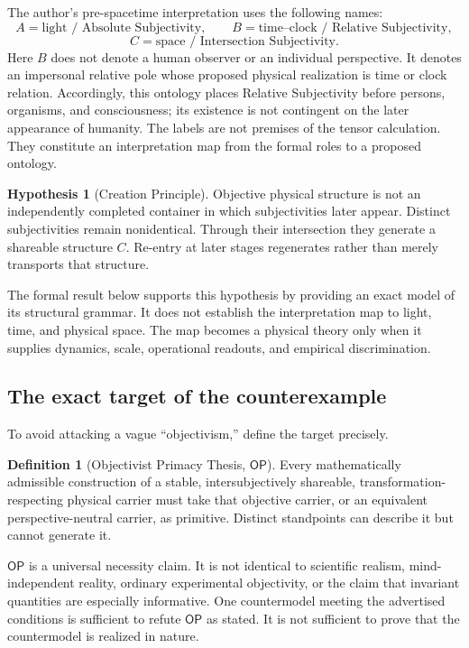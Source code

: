 \documentclass[11pt]{article}
\theoremstyle{definition}
\newtheorem{definition}[theorem]{Definition}
\newtheorem{hypothesis}[theorem]{Hypothesis}
\theoremstyle{remark}
\newcommand{\OPT}{\mathsf{OP}}
\begin{document}
The author's pre-spacetime interpretation uses the following names:
\[
 A=\text{light / Absolute Subjectivity},\qquad
 B=\text{time--clock / Relative Subjectivity},
\]
\[
 C=\text{space / Intersection Subjectivity}.
\]
Here $B$ does not denote a human observer or an individual perspective. It denotes an impersonal relative pole whose proposed physical realization is time or clock relation. Accordingly, this ontology places Relative Subjectivity before persons, organisms, and consciousness; its existence is not contingent on the later appearance of humanity.
The labels are not premises of the tensor calculation. They constitute an interpretation map from the formal roles to a proposed ontology.

\begin{hypothesis}[Creation Principle]\label{hyp:cp}
Objective physical structure is not an independently completed container in which subjectivities later appear. Distinct subjectivities remain nonidentical. Through their intersection they generate a shareable structure $C$. Re-entry at later stages regenerates rather than merely transports that structure.
\end{hypothesis}

The formal result below supports this hypothesis by providing an exact model of its structural grammar. It does not establish the interpretation map to light, time, and physical space. The map becomes a physical theory only when it supplies dynamics, scale, operational readouts, and empirical discrimination.

\subsection{The exact target of the counterexample}

To avoid attacking a vague ``objectivism,'' define the target precisely.

\begin{definition}[Objectivist Primacy Thesis, $\OPT$]\label{def:opt}
Every mathematically admissible construction of a stable, intersubjectively shareable, transformation-respecting physical carrier must take that objective carrier, or an equivalent perspective-neutral carrier, as primitive. Distinct standpoints can describe it but cannot generate it.
\end{definition}

$\OPT$ is a universal necessity claim. It is not identical to scientific realism, mind-independent reality, ordinary experimental objectivity, or the claim that invariant quantities are especially informative. One countermodel meeting the advertised conditions is sufficient to refute $\OPT$ as stated. It is not sufficient to prove that the countermodel is realized in nature.
\end{document}
